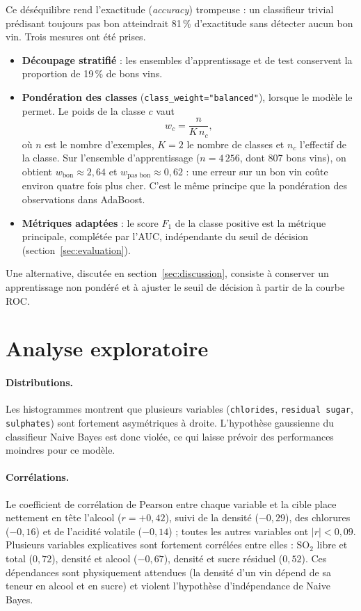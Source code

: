 \documentclass[11pt,a4paper]{article}
\newcommand{\code}[1]{\texttt{#1}}
\newcommand{\Fun}{F_1}
\begin{document}
Ce déséquilibre rend l'exactitude (\emph{accuracy}) trompeuse : un classifieur trivial prédisant toujours \og pas bon \fg{} atteindrait 81\,\% d'exactitude sans détecter aucun bon vin. Trois mesures ont été prises.
\begin{itemize}
  \item \textbf{Découpage stratifié} : les ensembles d'apprentissage et de test conservent la proportion de 19\,\% de bons vins.
  \item \textbf{Pondération des classes} (\code{class\_weight="balanced"}), lorsque le modèle le permet. Le poids de la classe $c$ vaut
  \begin{equation}
    w_c = \frac{n}{K\, n_c},
  \end{equation}
  où $n$ est le nombre d'exemples, $K=2$ le nombre de classes et $n_c$ l'effectif de la classe. Sur l'ensemble d'apprentissage ($n = 4\,256$, dont 807 bons vins), on obtient $w_{\text{bon}} \approx 2{,}64$ et $w_{\text{pas bon}} \approx 0{,}62$ : une erreur sur un bon vin coûte environ quatre fois plus cher. C'est le même principe que la pondération des observations dans AdaBoost.
  \item \textbf{Métriques adaptées} : le score $\Fun$ de la classe positive est la métrique principale, complétée par l'AUC, indépendante du seuil de décision (section~\ref{sec:evaluation}).
\end{itemize}
Une alternative, discutée en section~\ref{sec:discussion}, consiste à conserver un apprentissage non pondéré et à ajuster le seuil de décision à partir de la courbe ROC.

\section{Analyse exploratoire}\label{sec:eda}

\paragraph{Distributions.} Les histogrammes montrent que plusieurs variables (\code{chlorides}, \code{residual sugar}, \code{sulphates}) sont fortement asymétriques à droite. L'hypothèse gaussienne du classifieur Naive Bayes est donc violée, ce qui laisse prévoir des performances moindres pour ce modèle.

\paragraph{Corrélations.} Le coefficient de corrélation de Pearson entre chaque variable et la cible place nettement en tête l'alcool ($r = +0{,}42$), suivi de la densité ($-0{,}29$), des chlorures ($-0{,}16$) et de l'acidité volatile ($-0{,}14$) ; toutes les autres variables ont $|r| < 0{,}09$. Plusieurs variables explicatives sont fortement corrélées entre elles : SO$_2$ libre et total ($0{,}72$), densité et alcool ($-0{,}67$), densité et sucre résiduel ($0{,}52$). Ces dépendances sont physiquement attendues (la densité d'un vin dépend de sa teneur en alcool et en sucre) et violent l'hypothèse d'indépendance de Naive Bayes.
\end{document}
